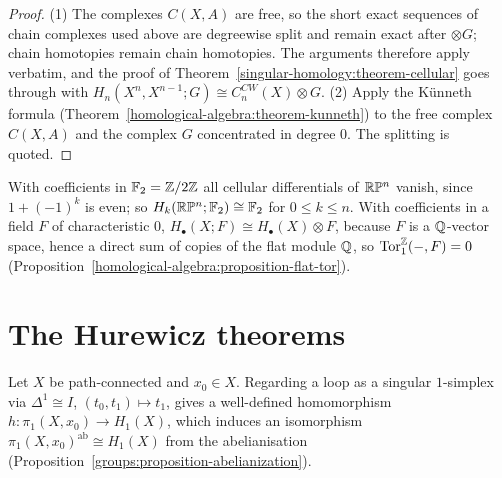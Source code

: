 \begin{proof}
(1) The complexes $C(X, A)$ are free, so the short exact sequences of chain complexes used above are degreewise split and remain exact after $\otimes G$; chain homotopies
remain chain homotopies. The arguments therefore apply verbatim, and the proof of Theorem~\ref{singular-homology:theorem-cellular} goes through with
$H_n(X^n, X^{n-1}; G) \cong C^{CW}_n(X) \otimes G$. (2) Apply the K\"unneth formula (Theorem~\ref{homological-algebra:theorem-kunneth}) to the free complex $C(X, A)$ and
the complex $G$ concentrated in degree $0$. The splitting is quoted.
\end{proof}

\begin{example}\label{singular-homology:example-rp-mod-2}
With coefficients in $\mathbb{F}_2 = \mathbb{Z}/2\mathbb{Z}$ all cellular differentials of $\mathbb{R}\mathbb{P}^n$ vanish, since $1 + (-1)^k$ is even; so $H_k(\mathbb{R}\mathbb{P}^n; \mathbb{F}_2) \cong \mathbb{F}_2$ for
$0 \leq k \leq n$. With coefficients in a field $F$ of characteristic $0$, $H_\bullet(X; F) \cong H_\bullet(X) \otimes F$, because $F$ is a $\mathbb{Q}$-vector space, hence a direct sum of copies of the flat module $\mathbb{Q}$, so $\operatorname{Tor}_1^{\mathbb{Z}}(-, F) = 0$
(Proposition~\ref{homological-algebra:proposition-flat-tor}).
\end{example}

\section{The Hurewicz theorems}\label{singular-homology:section-hurewicz}

\begin{theorem}\label{singular-homology:theorem-hurewicz}
Let $X$ be path-connected and $x_0 \in X$. Regarding a loop as a singular $1$-simplex via $\Delta^1 \cong I$, $(t_0, t_1) \mapsto t_1$, gives a well-defined homomorphism
$h \colon \pi_1(X, x_0) \to H_1(X)$, which induces an isomorphism $\pi_1(X, x_0)^{\mathrm{ab}} \cong H_1(X)$ from the abelianisation
(Proposition~\ref{groups:proposition-abelianization}).
\end{theorem}

